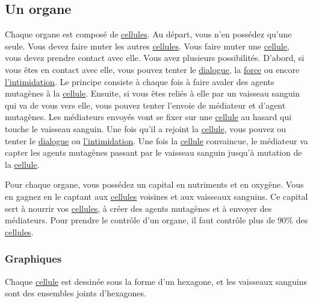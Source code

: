 \documentclass{article}
\begin{document}
\subsection{Un organe}\label{organe}
Chaque organe est composé de \hyperref[cellule]{cellules}. Au départ, vous n'en possédez qu'une seule. Vous devez faire muter les autres \hyperref[cellule]{cellules}. Vous faire muter une \hyperref[cellule]{cellule}, vous devez prendre contact avec elle. Vous avez plusieurs possibilités. D'abord, si vous êtes en contact avec elle, vous pouvez tenter le \hyperref[dialogue]{dialogue}, la \hyperref[force]{force} ou encore \hyperref[intimi]{l'intimidation}. Le principe consiste à chaque fois à faire avaler des agents mutagènes à la \hyperref[cellule]{cellule}. Ensuite, si vous êtes reliés à elle par un vaisseau sanguin qui va de vous vers elle, vous pouvez tenter l'envoie de médiateur et d'agent mutagènes. Les médiateurs envoyés vont se fixer sur une \hyperref[cellule]{cellule} au hasard qui touche le vaisseau sanguin. Une fois qu'il a rejoint la \hyperref[cellule]{cellule}, vous pouvez ou tenter le \hyperref[dialogue]{dialogue} ou \hyperref[intimi]{l'intimidation}. Une fois la \hyperref[cellule]{cellule} convaincue, le médiateur va capter les agents mutagènes passant par le vaisseau sanguin jusqu'à mutation de la \hyperref[cellule]{cellule}.

Pour chaque organe, vous possédez un capital en nutriments et en oxygène. Vous en gagnez en le captant aux \hyperref[cellule]{cellules} voisines et aux vaisseaux sanguins. Ce capital sert à nourrir vos \hyperref[cellule]{cellules}, à créer des agents mutagènes et à envoyer des médiateurs. Pour prendre le contrôle d'un organe, il faut contrôle plus de 90\% des \hyperref[cellule]{cellules}.

\subsubsection{Graphiques}
Chaque \hyperref[cellule]{cellule} est dessinée sous la forme d'un hexagone, et les vaisseaux sanguins sont des ensembles joints d'hexagones.
\end{document}
